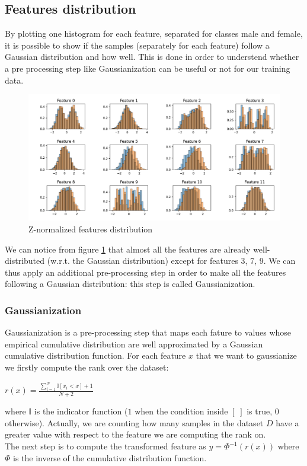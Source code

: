 \documentclass[10pt, a4paper, twocolumn]{article} %
\begin{document}
\subsection{Features distribution}
By plotting one histogram for each feature, separated for classes male and female, it is possible to show
if the samples (separately for each feature) follow a Gaussian distribution and how well. This
is done in order to understend whether a pre processing step like Gaussianization can be useful or not for our training data.
\begin{figure}[ht!]
	\includegraphics[width=\linewidth]{./Pictures/FeaturesAnalysis/hist_znorm.png}
	\caption{Z-normalized features distribution}
	\label{hist_znorm} 
\end{figure}

We can notice from figure \ref{hist_znorm} that almost all the features are already 
well-distributed (w.r.t. the Gaussian distribution) except for features 3, 7, 9. 
We can thus apply an additional pre-processing step in order to make all the features following a Gaussian distribution:
this step is called Gaussianization.

\subsubsection{Gaussianization}
Gaussianization is a pre-processing step that maps each fature to values whose empirical cumulative
distribution are well approximated by a Gaussian cumulative distribution function. For each
feature $x$ that we want to gaussianize we firstly compute the rank over the dataset:\\
\begin{center}
	\begin{math}
		r(x) = \frac{\sum_{i=1}^{N}\mathbb{I}[x_{i} < x] + 1}{N + 2}
	\end{math}
\end{center}
where $\mathbb{I}$ is the indicator function ($1$ when the condition inside $[\;]$ is true, $0$ 
otherwise). Actually, we are counting how many samples in the dataset $D$ have a greater value
with respect to the feature we are computing the rank on. \\
The next step is to compute the transformed feature as $y = \Phi^{-1}(r(x))$ where $\Phi$ is
the inverse of the cumulative distribution function. 
\end{document}
